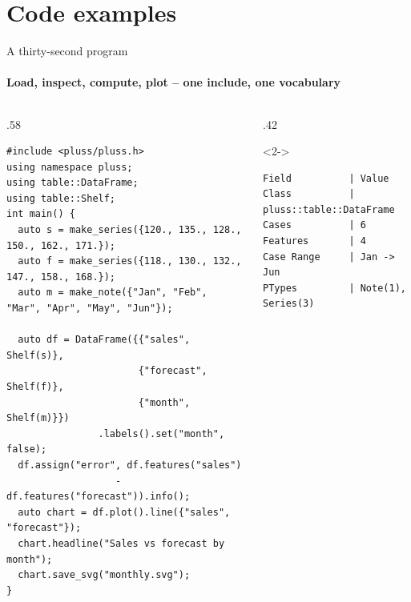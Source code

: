 \documentclass[aspectratio=169,11pt,t,handout]{beamer}
\begin{document}
\section{Code examples}
\begin{frame}[fragile]{A thirty-second program}
  \framesubtitle{Load, inspect, compute, plot -- one include, one vocabulary}
  \begin{columns}[T,onlytextwidth]
    \begin{column}{.58\textwidth}
\begin{lstlisting}[basicstyle=\ttfamily\fontsize{6.6}{8}\selectfont]
#include <pluss/pluss.h>
using namespace pluss;
using table::DataFrame;
using table::Shelf;
int main() {
  auto s = make_series({120., 135., 128., 150., 162., 171.});
  auto f = make_series({118., 130., 132., 147., 158., 168.});
  auto m = make_note({"Jan", "Feb", "Mar", "Apr", "May", "Jun"});

  auto df = DataFrame({{"sales", Shelf(s)},
                       {"forecast", Shelf(f)},
                       {"month", Shelf(m)}})
                .labels().set("month", false);
  df.assign("error", df.features("sales")
                   - df.features("forecast")).info();
  auto chart = df.plot().line({"sales", "forecast"});
  chart.headline("Sales vs forecast by month");
  chart.save_svg("monthly.svg");
}
\end{lstlisting}
    \end{column}
    \begin{column}{.42\textwidth}
      \begin{uncoverenv}<2->
\begin{lstlisting}[style=out]
Field          | Value
Class          | pluss::table::DataFrame
Cases          | 6
Features       | 4
Case Range     | Jan -> Jun
PTypes         | Note(1), Series(3)
\end{lstlisting}
      \end{uncoverenv}\vspace{.6ex}
    \end{column}
  \end{columns}
\end{frame}
\end{document}
